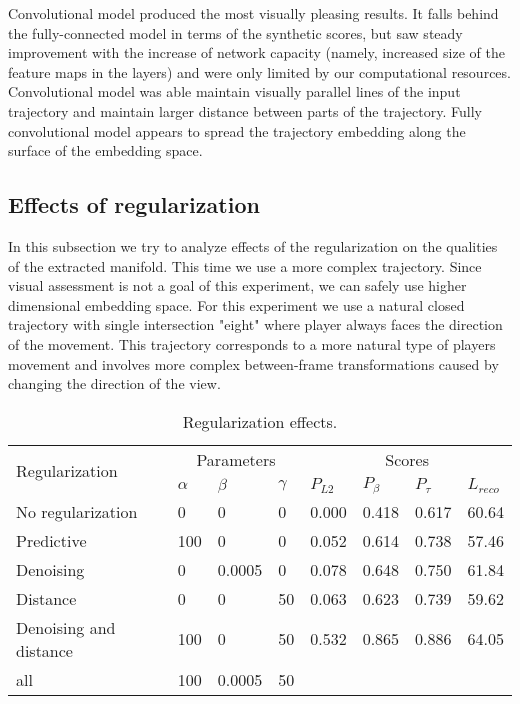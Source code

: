 Convolutional model produced the most visually pleasing results. It falls behind the fully-connected model in terms of the synthetic scores, but saw steady improvement with the increase of network capacity (namely, increased size of the feature maps in the layers) and were only limited by our computational resources. Convolutional model was able maintain visually parallel lines of the input trajectory and maintain larger distance between parts of the trajectory. Fully convolutional model appears to spread the trajectory embedding along the surface of the embedding space.

\subsection{Effects of regularization}

In this subsection we try to analyze effects of the regularization on the qualities of the extracted manifold. This time we use a more complex trajectory. Since visual assessment is not a goal of this experiment, we can safely use higher dimensional embedding space. For this experiment we use a natural closed trajectory with single intersection "eight" where player always faces the direction of the movement. This trajectory corresponds to a more natural type of players movement and involves more complex between-frame transformations caused by changing the direction of the view.

\begin{table}
\begin{center}
    \begin{tabular}{| l | l | l | l | l | l | l | l |}
    \hline
    \multirow{2}{*}{Regularization}      &\multicolumn{3}{|c|}{Parameters} & \multicolumn{4}{|c|}{Scores}  \\   \cline{2-8}

     & $\alpha$ & $\beta$ & $\gamma$    &  $P_{L2}$ & $P_{\beta}$ & $P_{\tau}$ & $L_{reco}$ \\ \hline

		No regularization 	& 0    & 0 & 0 & 0.000 & 0.418 & 0.617 & 60.64 \\
		Predictive          & 100  & 0 & 0 & 0.052 & 0.614 & 0.738 & 57.46 \\
		Denoising           & 0    & 0.0005 & 0 & 0.078 & 0.648 & 0.750 & 61.84 \\
		Distance            & 0    & 0 & 50 & 0.063 & 0.623 & 0.739 & 59.62 \\
    Denoising and distance& 100 & 0 & 50 & 0.532 & 0.865 & 0.886 & 64.05 \\
		all   & 100 & 0.0005 & 50 & & & &													\\ \hline
    \end{tabular}
\end{center}
  \caption{Regularization effects.}
  \label{tab:8emb}
\end{table}

